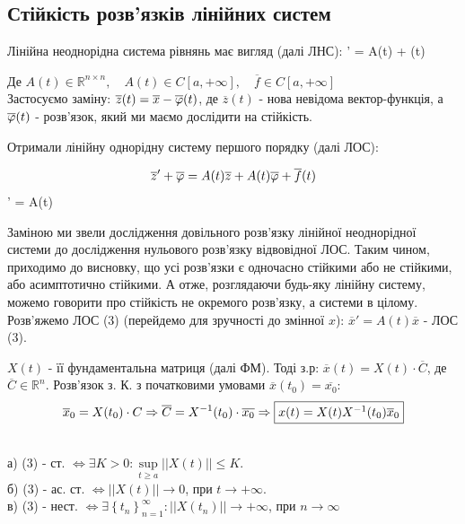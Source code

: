\documentclass[14pt,a4paper]{scrartcl}
\theoremstyle{definition}
\theoremstyle{definition}
\theoremstyle{definition}
\begin{document}
\subsection{Стійкість розв'язків лінійних систем}
Лінійна неоднорідна система рівнянь має вигляд (далі ЛНС):
\be
{}' = A(t)  +  (t)
\ee

$ \text{Де } A(t) \in \mathbb{R}^{n \times n}, \quad A(t) \in C [ a, + \infty], \quad \overline{f} \in C[a, + \infty] $ \\
Застосуємо заміну: $ \overline{z} (t) = \overline{x} - \overline{\varphi} (t)$, де $ \overline{z}(t)$ - нова невідома вектор-функція, а $\overline{\varphi} (t)$ - розв'язок, який ми маємо дослідити на стійкість.

Отримали лінійну однорідну систему першого порядку (далі ЛОС):

$$ \overline{z} '   + \overline{\varphi} = A(t)\overline{z} + A(t )\overline{\varphi} + \overline{f}(t) $$
\be
{}' = A(t) 
\ee

Заміною ми звели дослідження довільного розв'язку лінійної неоднорідної системи до дослідження нульового розв'язку відвовідної ЛОС. Таким чином, приходимо до висновку, що усі розв'язки є одночасно стійкими або не стійкими, або асимптотично стійкими. А отже, розглядаючи будь-яку лінійну систему, можемо говорити про стійкість не окремого розв'язку, а системи в цілому.\\

Розв'яжемо ЛОС (3) (перейдемо для зручності до змінної $x$): $ \overline{x}'  =  A(t) \overline{x} $ - ЛОС (3).

$X(t) $ - її фундаментальна матриця (далі ФМ). Тоді з.р: $ \overline{x} (t) = X(t) \cdot \overline{C}$, де $\overline{ C} \in \mathbb{R}^n$.
Розв'язок з. К. з початковими умовами $ \overline{x} (t_0) = \overline{x_0}$:
$$
\overline{x}_0 = X(t_0) \cdot C \Rightarrow \overline{C} = X^{-1} (t_0) \cdot \overline{x_0} \Rightarrow \fbox{$x(t) = X(t) X^{-1}(t_0) \overline{x}_0$}
$$


\begin{boxteo}\quad \\
а) (3) - ст. $\Longleftrightarrow \exists K > 0: \sup\limits_{t\geq  a} ||X(t) || \leq K$.\\
б) (3) - ас. ст. $\Longleftrightarrow  ||X(t)|| \to 0 $, при $ t \to +\infty$.\\
в) (3) - нест. $ \Longleftrightarrow \exists \left\lbrace t_n \right\rbrace_{n=1}^{\infty} : ||X(t_n)|| \to +\infty $, при $n \to \infty$
\end{boxteo}


% 
\end{document}
